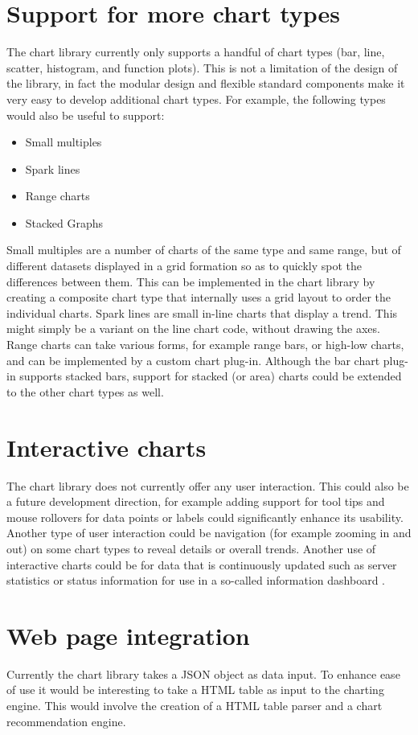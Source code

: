 \section{Support for more chart types}
The chart library currently only supports a handful of chart types (bar, line, scatter, histogram, and function plots). This is not a limitation of the design of the library, in fact the modular design and flexible standard components make it very easy to develop additional chart types. For example, the following types would also be useful to support:
\begin{itemize}
\item Small multiples
\item Spark lines
\item Range charts
\item Stacked Graphs
\end{itemize}

Small multiples \cite{tufte01} are a number of charts of the same type and same range, but of different datasets displayed in a grid formation so as to quickly spot the differences between them. This can be implemented in the chart library by creating a composite chart type that internally uses a grid layout to order the individual charts.  Spark lines \cite{tufte06} are small in-line charts that display a trend. This might simply be a variant on the line chart code, without drawing the axes. Range charts can take various forms, for example range bars, or high-low charts, and can be implemented by a custom chart plug-in. Although the bar chart plug-in supports stacked bars, support for stacked (or area) charts \cite{byron08} could be extended to the other chart types as well.


\section{Interactive charts}
The chart library does not currently offer any user interaction. This could also be a future development direction, for example adding support for tool tips and mouse rollovers for data points or labels could significantly enhance its usability. Another type of user interaction could be navigation (for example zooming in and out) on some chart types to reveal details or overall trends. Another use of interactive charts could be for data that is continuously updated such as server statistics or status information for use in a so-called information dashboard \cite{few06}.

\section{Web page integration}
Currently the chart library takes a JSON object as data input. To enhance ease of use it would be interesting to take a HTML table as input to the charting engine. This would involve the creation of a HTML table parser and a chart recommendation engine. 

